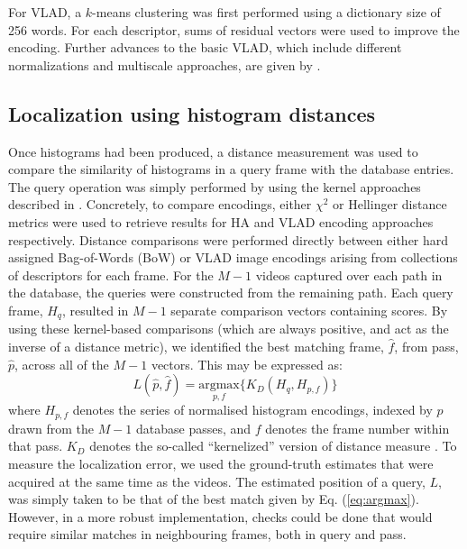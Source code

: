 For VLAD, a $k$-means clustering was first performed using a dictionary size of 256 words. For each descriptor, sums of residual vectors were used to improve the encoding.  Further advances to the basic VLAD, which include different normalizations and multiscale approaches, are given by \cite{Arandjelovic}. 

\subsection{Localization using histogram distances}
\label{sec:kernel_encodings}
Once histograms had been produced, a distance measurement was used to compare the similarity of histograms in a query frame with the database entries.  The query operation was simply performed by using the kernel approaches described in \cite{Vedaldi2010}.  Concretely, to compare encodings, either $\chi^2$ or Hellinger distance metrics \citep{Vedaldi2012} were used to retrieve results for HA and VLAD encoding approaches respectively. Distance comparisons were performed directly between either hard assigned Bag-of-Words (BoW) or VLAD image encodings arising from collections of descriptors for each frame. For the $M-1$ videos captured over each path in the database, the queries were constructed from the remaining path.   Each query frame, $H_q$, resulted in $M-1$ separate comparison vectors containing scores.  By using these kernel-based comparisons (which are always positive, and act as the inverse of a distance metric), we identified the best matching frame, $\hat{f}$, from pass, $\hat{p}$, across all of the $M-1$ vectors.  This may be expressed as: 
\begin{equation}
L(\hat{p},\hat{f}) = \underset{p,f}{\textrm{argmax}} \lbrace K_{D}(H_q,H_{p,f})\rbrace
\label{eq:argmax}
\end{equation}
where $H_{p,f}$ denotes the series of normalised histogram encodings, indexed by $p$ drawn from the $M-1$ database passes, and $f$ denotes the frame number within that pass. $K_D$ denotes the so-called ``kernelized'' version of distance measure \cite{Vedaldi2010}.  To measure the localization error, we used the ground-truth estimates that were acquired at the same time as the videos. The estimated position of a query, $L$, was simply taken to be that of the best match given by Eq. (\ref{eq:argmax}).  However, in a more robust implementation, checks could be done that would require similar matches in neighbouring frames, both in query and pass.


